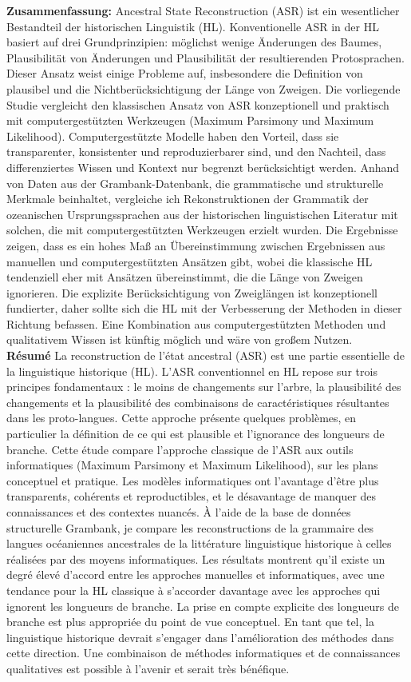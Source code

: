 \documentclass[12pt,letterpaper]{article}
\begin{document}
\textbf{Zusammenfassung:}
Ancestral State Reconstruction (ASR) ist ein wesentlicher Bestandteil der historischen Linguistik (HL). Konventionelle ASR in der HL basiert auf drei Grundprinzipien: möglichst wenige Änderungen des Baumes, Plausibilität von Änderungen und Plausibilität der resultierenden Protosprachen. Dieser Ansatz weist einige Probleme auf, insbesondere die Definition von plausibel und die Nichtberücksichtigung der Länge von Zweigen. Die vorliegende Studie vergleicht den klassischen Ansatz von ASR konzeptionell und praktisch mit computergestützten Werkzeugen (Maximum Parsimony und Maximum Likelihood). Computergestützte Modelle haben den Vorteil, dass sie transparenter, konsistenter und reproduzierbarer sind, und den Nachteil, dass differenziertes Wissen und Kontext nur begrenzt berücksichtigt werden. Anhand von Daten aus der Grambank-Datenbank, die grammatische und strukturelle Merkmale beinhaltet, vergleiche ich Rekonstruktionen der Grammatik der ozeanischen Ursprungssprachen aus der historischen linguistischen Literatur mit solchen, die mit computergestützten Werkzeugen erzielt wurden. Die Ergebnisse zeigen, dass es ein hohes Maß an Übereinstimmung zwischen Ergebnissen aus manuellen und computergestützten Ansätzen gibt, wobei die klassische HL tendenziell eher mit Ansätzen übereinstimmt, die die Länge von Zweigen ignorieren. Die explizite Berücksichtigung von Zweiglängen ist konzeptionell fundierter, daher sollte sich die HL mit der Verbesserung der Methoden in dieser Richtung befassen. Eine Kombination aus computergestützten Methoden und qualitativem Wissen ist künftig möglich und wäre von großem Nutzen.
{\\}
\textbf{Résumé}
La reconstruction de l'état ancestral (ASR) est une partie essentielle de la linguistique historique (HL). L'ASR conventionnel en HL repose sur trois principes fondamentaux : le moins de changements sur l'arbre, la plausibilité des changements et la plausibilité des combinaisons de caractéristiques résultantes dans les proto-langues. Cette approche présente quelques problèmes, en particulier la définition de ce qui est plausible et l'ignorance des longueurs de branche. Cette étude compare l'approche classique de l'ASR aux outils informatiques (Maximum Parsimony et Maximum Likelihood), sur les plans conceptuel et pratique. Les modèles informatiques ont l'avantage d'être plus transparents, cohérents et reproductibles, et le désavantage de manquer des connaissances et des contextes nuancés. À l'aide de la base de données structurelle Grambank, je compare les reconstructions de la grammaire des langues océaniennes ancestrales de la littérature linguistique historique à celles réalisées par des moyens informatiques. Les résultats montrent qu'il existe un degré élevé d'accord entre les approches manuelles et informatiques, avec une tendance pour la HL classique à s'accorder davantage avec les approches qui ignorent les longueurs de branche. La prise en compte explicite des longueurs de branche est plus appropriée du point de vue conceptuel. En tant que tel, la linguistique historique devrait s'engager dans l'amélioration des méthodes dans cette direction. Une combinaison de méthodes informatiques et de connaissances qualitatives est possible à l'avenir et serait très bénéfique.
\end{document}
